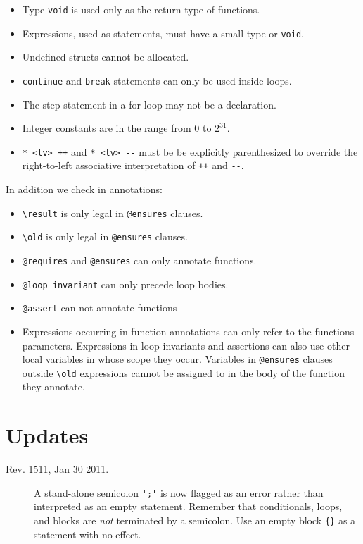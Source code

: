 \documentclass[11pt]{article}
\begin{document}
\begin{itemize}
\item Type \verb'void' is used only as the return type of functions.
\item Expressions, used as statements, must have a small type or \verb'void'.
\item Undefined structs cannot be allocated.
\item \verb'continue' and \verb'break' statements can
  only be used inside loops.
\item The step statement in a for loop may not be a declaration.
\item Integer constants are in the range from $0$ to $2^{31}$.
\item \verb'* <lv> ++' and \verb'* <lv> --' must be
  be explicitly parenthesized to override the right-to-left
  associative interpretation of \verb'++' and \verb'--'.
\end{itemize}

In addition we check in annotations:
\begin{itemize}
\item \verb'\result' is only legal in \verb'@ensures' clauses.
\item \verb'\old' is only legal in \verb'@ensures' clauses.
\item \verb'@requires' and \verb'@ensures' can only annotate functions.
\item \verb'@loop_invariant' can only precede loop bodies.
\item \verb'@assert' can not annotate functions
\item Expressions occurring in function annotations can only refer to
  the functions parameters.  Expressions in loop invariants and
  assertions can also use other local variables in whose scope they
  occur.  Variables in \verb'@ensures' clauses outside \verb'\old'
  expressions cannot be assigned to in the body of the function they
  annotate.
\end{itemize}

\section{Updates}
\label{sec:updates}
\hypertarget{sec:updates}{}

\begin{description}
\item[Rev. 1511, Jan 30 2011.] A stand-alone semicolon \verb"';'" is
  now flagged as an error rather than interpreted as an empty
  statement.  Remember that conditionals, loops, and blocks are
  \emph{not} terminated by a semicolon.  Use an empty block \verb'{}'
  as a statement with no effect.
\end{description}
\end{document}
